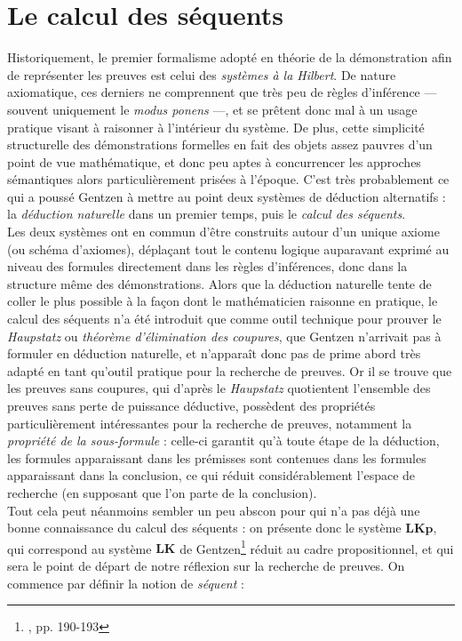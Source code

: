 \documentclass[12pt]{report}
\begin{document}
\section{Le calcul des séquents}

Historiquement, le premier formalisme adopté en théorie de la démonstration afin de représenter les preuves est celui des \emph{systèmes à la Hilbert}. De nature axiomatique, ces derniers ne comprennent que très peu de règles d'inférence --- souvent uniquement le \textit{modus ponens} ---, et se prêtent donc mal à un usage pratique visant à raisonner à l'intérieur du système. De plus, cette simplicité structurelle des démonstrations formelles en fait des objets assez pauvres d'un point de vue mathématique, et donc peu aptes à concurrencer les approches sémantiques alors particulièrement prisées à l'époque. C'est très probablement ce qui a poussé Gentzen à mettre au point deux systèmes de déduction alternatifs : la \emph{déduction naturelle} dans un premier temps, puis le \emph{calcul des séquents}.\\

Les deux systèmes ont en commun d'être construits autour d'un unique axiome (ou schéma d'axiomes), déplaçant tout le contenu logique auparavant exprimé au niveau des formules directement dans les règles d'inférences, donc dans la structure même des démonstrations. Alors que la déduction naturelle tente de coller le plus possible à la façon dont le mathématicien raisonne en pratique, le calcul des séquents n'a été introduit que comme outil technique pour prouver le \textit{Haupstatz} ou \emph{théorème d'élimination des coupures}, que Gentzen n'arrivait pas à formuler en déduction naturelle, et n'apparaît donc pas de prime abord très adapté en tant qu'outil pratique pour la recherche de preuves. Or il se trouve que les preuves sans coupures, qui d'après le \textit{Haupstatz} quotientent l'ensemble des preuves sans perte de puissance déductive, possèdent des propriétés particulièrement intéressantes pour la recherche de preuves, notamment la \emph{propriété de la sous-formule} : celle-ci garantit qu'à toute étape de la déduction, les formules apparaissant dans les prémisses sont contenues dans les formules apparaissant dans la conclusion, ce qui réduit considérablement l'espace de recherche (en supposant que l'on parte de la conclusion).\\

Tout cela peut néanmoins sembler un peu abscon pour qui n'a pas déjà une bonne connaissance du calcul des séquents : on présente donc le système $\mathbf{LKp}$, qui correspond au système $\mathbf{LK}$ de Gentzen\footnote{\cite{Gen35}, pp. 190-193} réduit au cadre propositionnel, et qui sera le point de départ de notre réflexion sur la recherche de preuves. On commence par définir la notion de \emph{séquent} :
\end{document}

